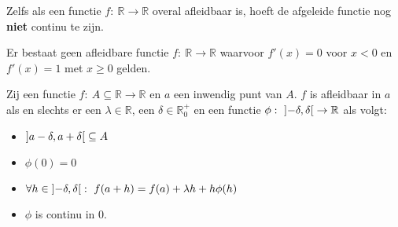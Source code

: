 \documentclass[main.tex]{subfiles}
\begin{document}
\begin{tvb}
  Zelfs als een functie $f:\ \mathbb{R} \rightarrow \mathbb{R}$ overal afleidbaar is, hoeft de afgeleide functie nog \textbf{niet} continu te zijn.
\end{tvb}

\begin{tvb}
   Er bestaat geen afleidbare functie $f:\ \mathbb{R} \rightarrow \mathbb{R}$ waarvoor $f'(x)=0$ voor $x<0$ en $f'(x)=1$ met $x \ge 0$ gelden.

\end{tvb}

\begin{st}
  Zij een functie $f:\ A \subseteq \mathbb{R} \rightarrow \mathbb{R}$ en $a$ een inwendig punt van $A$.
  $f$ is afleidbaar in $a$ als en slechts er een $\lambda \in \mathbb{R}$, een $\delta \in \mathbb{R}_{0}^{+}$ en een functie $\phi:\ \interval[open]{-\delta}{\delta} \rightarrow \mathbb{R}$ als volgt:
  \begin{itemize}
  \item $\interval[open]{a-\delta}{a+\delta}\subseteq A$
  \item $\phi(0) = 0$
  \item $\forall h \in \interval[open]{-\delta}{\delta}:\ f(a+h) = f(a) + \lambda h + h\phi(h)$ 
  \item $\phi$ is continu in $0$.
  \end{itemize}


\end{st}
\end{document}

